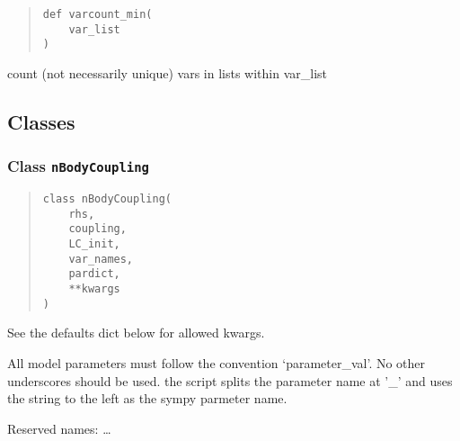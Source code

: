 \documentclass[english,a4paper,oneside]{article}
\begin{document}
\begin{quote}
\begin{verbatim}
def varcount_min(
    var_list
)
\end{verbatim}
\end{quote}

count (not necessarily unique) vars in lists within var\_list

\hypertarget{classes}{%
\subsection{Classes}\label{classes}}

\hypertarget{nBodyCoupling.nBodyCoupling}{%
\subsubsection{\texorpdfstring{Class
\texttt{nBodyCoupling}}{Class nBodyCoupling}}\label{nBodyCoupling.nBodyCoupling}}

\begin{quote}
\begin{verbatim}
class nBodyCoupling(
    rhs,
    coupling,
    LC_init,
    var_names,
    pardict,
    **kwargs
)
\end{verbatim}
\end{quote}

See the defaults dict below for allowed kwargs.

All model parameters must follow the convention `parameter\_val'. No
other underscores should be used. the script splits the parameter name
at '\_' and uses the string to the left as the sympy parmeter name.

Reserved names: \ldots{}
\end{document}
